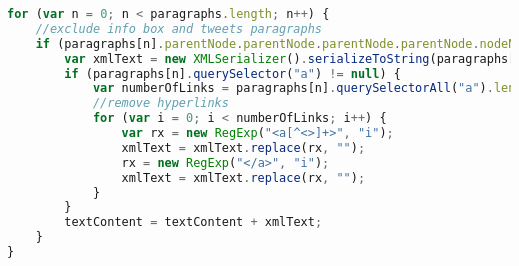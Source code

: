 \begin{lstlisting}[language= Javascript,caption=Vermeidung von Infoboxen und Twitternachrichten sowie Hyperlinks in den Artikeln., label={lst:artikelabsätze}]
for (var n = 0; n < paragraphs.length; n++) {
    //exclude info box and tweets paragraphs
    if (paragraphs[n].parentNode.parentNode.parentNode.parentNode.nodeName != "infobox" && paragraphs[n].parentNode.getAttribute("class") != "twitter-tweet"){
        var xmlText = new XMLSerializer().serializeToString(paragraphs[n]);
        if (paragraphs[n].querySelector("a") != null) {
            var numberOfLinks = paragraphs[n].querySelectorAll("a").length;
            //remove hyperlinks
            for (var i = 0; i < numberOfLinks; i++) {
                var rx = new RegExp("<a[^<>]+>", "i");
                xmlText = xmlText.replace(rx, "");
                rx = new RegExp("</a>", "i");
                xmlText = xmlText.replace(rx, "");
            }
        }
        textContent = textContent + xmlText;
    }
}
\end{lstlisting} 